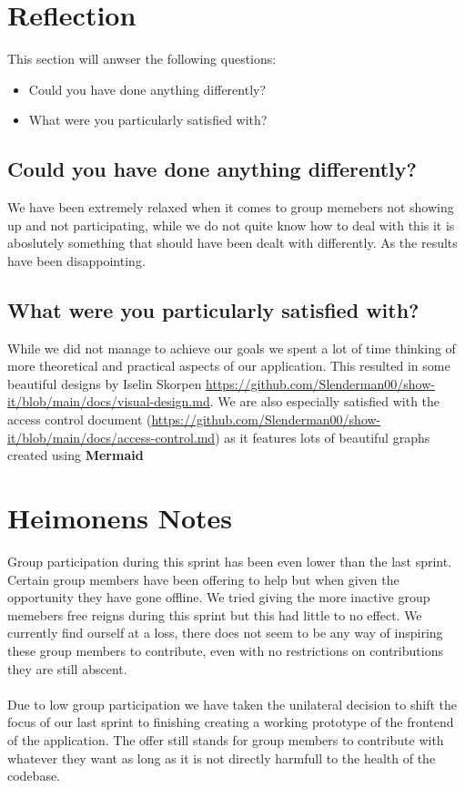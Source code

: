 \documentclass[12pt]{article}
\begin{document}
\section{Reflection}
This section will anwser the following questions:
\begin{itemize}
    \item Could you have done anything differently?
    \item What were you particularly satisfied with?
\end{itemize}

\subsection{Could you have done anything differently?}
We have been extremely relaxed when it comes to group memebers not showing up and not participating, while 
we do not quite know how to deal with this it is aboslutely something that should have been dealt with differently.
As the results have been disappointing.

\subsection{What were you particularly satisfied with?}
While we did not manage to achieve our goals we spent a lot of time thinking of more theoretical and practical aspects of our application.
This resulted in some beautiful designs by Iselin Skorpen \url{https://github.com/Slenderman00/show-it/blob/main/docs/visual-design.md}.
We are also especially satisfied with the access control document (\url{https://github.com/Slenderman00/show-it/blob/main/docs/access-control.md})
as it features lots of beautiful graphs created using \textbf{Mermaid}\cite{MermaidDiagrammingCharting}


\section{Heimonens Notes}
Group participation during this sprint has been even lower than the last sprint. Certain group members
have been offering to help but when given the opportunity they have gone offline. We tried giving the more inactive group memebers
free reigns during this sprint but this had little to no effect. We currently find ourself at a loss, there does not seem to be any way
of inspiring these group members to contribute, even with no restrictions on contributions they are still abscent.
\\
\\
Due to low group participation we have taken the unilateral decision to shift the focus of our last 
sprint to finishing creating a working prototype of the frontend of the application. The offer still stands for
group members to contribute with whatever they want as long as it is not directly harmfull to the health of the codebase.

\pagebreak
\printbibliography
\end{document}
